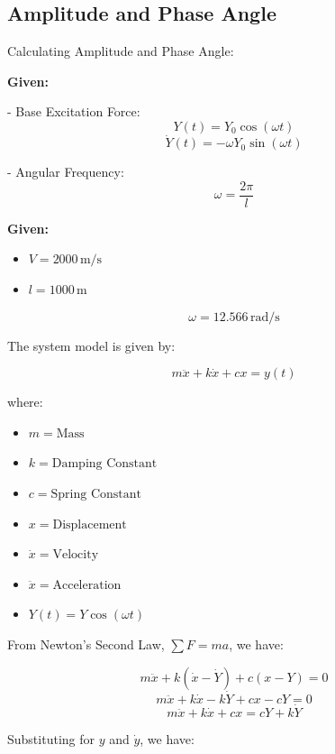 \documentclass[12pt,a4paper]{article}
\begin{document}
{\vspace{5pt}}

\subsection{Amplitude and Phase Angle}

Calculating Amplitude and Phase Angle:  

{\vspace{5pt}}

\textbf{Given:}

- Base Excitation Force: 
\[
Y(t) = Y_0 \cos(\omega t)
\]
\[
\dot{Y}(t) = -\omega Y_0 \sin(\omega t)
\]

- Angular Frequency: 
\[
\omega = \frac{2 \pi}{l}
\]

\textbf{Given:}
\begin{itemize}
    \item \( V = 2000 \, \text{m/s} \)
    \item \( l = 1000 \, \text{m} \)
\end{itemize}

\[
\omega = 12.566 \, \text{rad/s}
\]

The system model is given by:

\[
m \ddot{x}  + k \dot{x} + c x = y(t)
\]

where:
\begin{itemize}
    \item \( m = \text{Mass} \)
    \item \( k = \text{Damping Constant} \)
    \item \( c = \text{Spring Constant} \)
    \item \( x = \text{Displacement} \)
    \item \( \dot{x} = \text{Velocity} \)
    \item \( \ddot{x} = \text{Acceleration} \)
    \item \( Y(t) = Y \cos(\omega t) \)
\end{itemize}

{\vspace{5pt}}

From Newton's Second Law, \( \sum F = ma \), we have:

\[
m \ddot{x} + k (\dot{x} - \dot{Y}) + c(x - Y) = 0
\]
\[
m \ddot{x} + k \dot{x} - k \dot{Y} + c x - cY = 0
\]
\[
m \ddot{x} + k \dot{x} + c x = c Y + k \dot{Y}
\]

{\vspace{5pt}}

Substituting for \( y \) and \( \dot{y} \), we have:
\end{document}
